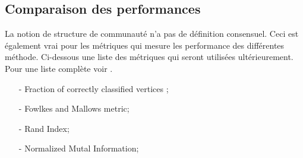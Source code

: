 \subsection{Comparaison des performances}
La notion de structure de communauté n'a pas de définition consensuel.
Ceci est également vrai pour les métriques qui mesure les performance des différentes méthode.
Ci-dessous une liste des métriques qui seront utilisées ultérieurement.
Pour une liste complète voir \cite[p.77-79]{Community_detection_in_graphs}.
\begin{itemize}
	\item[-] Fraction of correctly classified vertices ; 
	\item[-] Fowlkes and Mallows metric; 
	\item[-] Rand Index; 
	\item[-] Normalized Mutal Information; 
\end{itemize}